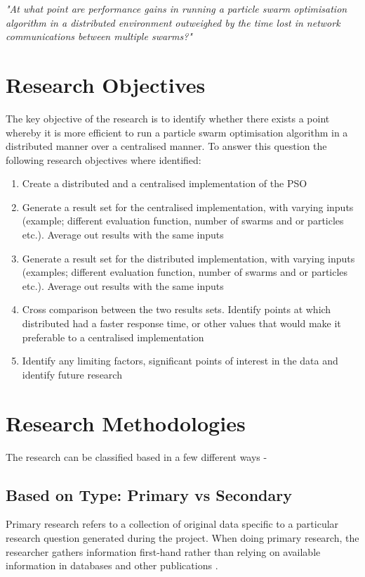 \documentclass[oneside,12pt]{book}
\begin{document}
\textit{"At what point are performance gains in running a particle swarm optimisation algorithm in a distributed environment outweighed by the time lost in network communications between multiple swarms?"}

\section{Research Objectives}
The key objective of the research is to identify whether there exists a point whereby it is more efficient to run a particle swarm optimisation algorithm in a distributed manner over a centralised manner. To answer this question the following research objectives where identified:
\begin{enumerate}
\item Create a distributed and a centralised implementation of the PSO
\item Generate a result set for the centralised implementation, with varying inputs (example; different evaluation function, number of swarms and or particles etc.). Average out results with the same inputs
\item Generate a result set for the distributed implementation, with varying inputs (examples; different evaluation function, number of swarms and or particles etc.). Average out results with the same inputs
\item Cross comparison between the two results sets. Identify points at which distributed had a faster response time, or other values that would make it preferable to a centralised implementation
\item Identify any limiting factors, significant points of interest in the data and identify future research
\end{enumerate}


\section{Research Methodologies}
The research can be classified based in a few different ways -

\subsection{Based on Type: Primary vs Secondary}
Primary research refers to a collection of original data specific to a particular research question generated during the project. When doing primary research, the researcher gathers information first-hand rather than relying on available information in databases and other publications \cite{bouchrika_2020}. 
\end{document}
